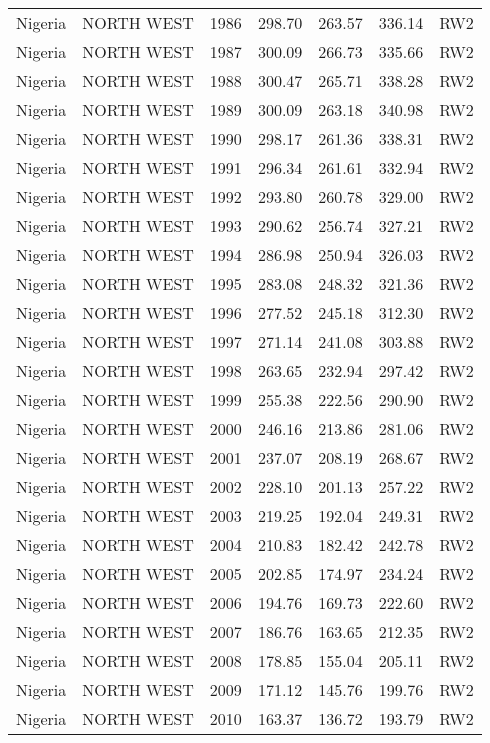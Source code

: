 \begin{longtable}{lllrrrl}
  Nigeria & NORTH WEST & 1986 & 298.70 & 263.57 & 336.14 & RW2 \\ 
  Nigeria & NORTH WEST & 1987 & 300.09 & 266.73 & 335.66 & RW2 \\ 
  Nigeria & NORTH WEST & 1988 & 300.47 & 265.71 & 338.28 & RW2 \\ 
  Nigeria & NORTH WEST & 1989 & 300.09 & 263.18 & 340.98 & RW2 \\ 
  Nigeria & NORTH WEST & 1990 & 298.17 & 261.36 & 338.31 & RW2 \\ 
  Nigeria & NORTH WEST & 1991 & 296.34 & 261.61 & 332.94 & RW2 \\ 
  Nigeria & NORTH WEST & 1992 & 293.80 & 260.78 & 329.00 & RW2 \\ 
  Nigeria & NORTH WEST & 1993 & 290.62 & 256.74 & 327.21 & RW2 \\ 
  Nigeria & NORTH WEST & 1994 & 286.98 & 250.94 & 326.03 & RW2 \\ 
  Nigeria & NORTH WEST & 1995 & 283.08 & 248.32 & 321.36 & RW2 \\ 
  Nigeria & NORTH WEST & 1996 & 277.52 & 245.18 & 312.30 & RW2 \\ 
  Nigeria & NORTH WEST & 1997 & 271.14 & 241.08 & 303.88 & RW2 \\ 
  Nigeria & NORTH WEST & 1998 & 263.65 & 232.94 & 297.42 & RW2 \\ 
  Nigeria & NORTH WEST & 1999 & 255.38 & 222.56 & 290.90 & RW2 \\ 
  Nigeria & NORTH WEST & 2000 & 246.16 & 213.86 & 281.06 & RW2 \\ 
  Nigeria & NORTH WEST & 2001 & 237.07 & 208.19 & 268.67 & RW2 \\ 
  Nigeria & NORTH WEST & 2002 & 228.10 & 201.13 & 257.22 & RW2 \\ 
  Nigeria & NORTH WEST & 2003 & 219.25 & 192.04 & 249.31 & RW2 \\ 
  Nigeria & NORTH WEST & 2004 & 210.83 & 182.42 & 242.78 & RW2 \\ 
  Nigeria & NORTH WEST & 2005 & 202.85 & 174.97 & 234.24 & RW2 \\ 
  Nigeria & NORTH WEST & 2006 & 194.76 & 169.73 & 222.60 & RW2 \\ 
  Nigeria & NORTH WEST & 2007 & 186.76 & 163.65 & 212.35 & RW2 \\ 
  Nigeria & NORTH WEST & 2008 & 178.85 & 155.04 & 205.11 & RW2 \\ 
  Nigeria & NORTH WEST & 2009 & 171.12 & 145.76 & 199.76 & RW2 \\ 
  Nigeria & NORTH WEST & 2010 & 163.37 & 136.72 & 193.79 & RW2 \\ 

\end{longtable}
